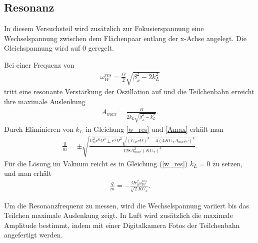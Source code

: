 \documentclass[a4paper,12pt]{article}
\begin{document}
\subsection{Resonanz}
In diesem Versuchsteil wird zusätzlich zur Fokusierspannung eine Wechselspannung zwischen dem Flächenpaar entlang der x-Achse angelegt.
Die Gleichspannung wird auf $0$ geregelt.

Bei einer Frequenz von
\begin{align}\label{w_res}
	\omega^{res}_W = \frac{\Omega}{2}\sqrt{\beta^{2}_x-2k^{2}_L}
\end{align}
tritt eine resonante Verstärkung der Oszillation auf und die Teilchenbahn erreicht ihre maximale Auslenkung
\begin{align}\label{Amax}
	A_{max} = \frac{B}{2k_L\sqrt{\beta^{2}_x-k^{2}_L}}.
\end{align}
Durch Eliminieren von $k_L$ in Gleichung \ref{w_res} und \ref{Amax} erhält man
\begin{align}\label{res_luft}
	\frac{q}{m} = ±\sqrt{
		\frac{
			U_w^2r^6Ω^4 ± r^4Ω^2\sqrt{
				(U_wrΩ)^4 - 4(4KU_xA_{max}ω)^4
			} %
		}{
			128A_{max}^2(KU_x)^4
		} %
	}. %
\end{align}
Für die Lösung im Vakuum reicht es in Gleichung (\ref{w_res}) $k_L=0$ zu setzen, und man erhält
\begin{align}\label{res_vak}
	\frac{q}{m} = -\frac{\Omega r^{2}_0 \omega^{res}_W}{\sqrt{2} K U_x}.
\end{align}

Um die Resonanzfrequenz zu messen, wird die Wechselspannung variiert bis das Teilchen maximale Auslenkung zeigt.
In Luft wird zusätzlich die maximale Amplitude bestimmt, indem mit einer Digitalkamera Fotos der Teilchenbahn angefertigt werden.
\end{document}

